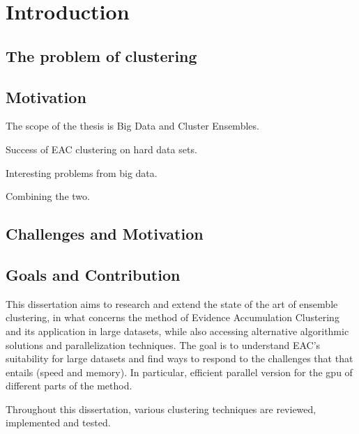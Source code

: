 
\section{Introduction}
\label{intro}

\subsection{The problem of clustering}


\subsection{Motivation}
The scope of the thesis is Big Data and Cluster Ensembles.

Success of EAC clustering on hard data sets.

Interesting problems from big data.

Combining the two.

\subsection{Challenges and Motivation}

\subsection{Goals and Contribution}

This dissertation aims to research and extend the state of the art of ensemble clustering, in what concerns the method of Evidence Accumulation Clustering and its application in large datasets, while also accessing alternative algorithmic solutions and parallelization techniques. The goal is to understand EAC's suitability for large datasets and find ways to respond to the challenges that that entails (speed and memory). In particular, efficient parallel version for the \gls{gpu} of different parts of the method.

Throughout this dissertation, various clustering techniques are reviewed, implemented and tested. 

